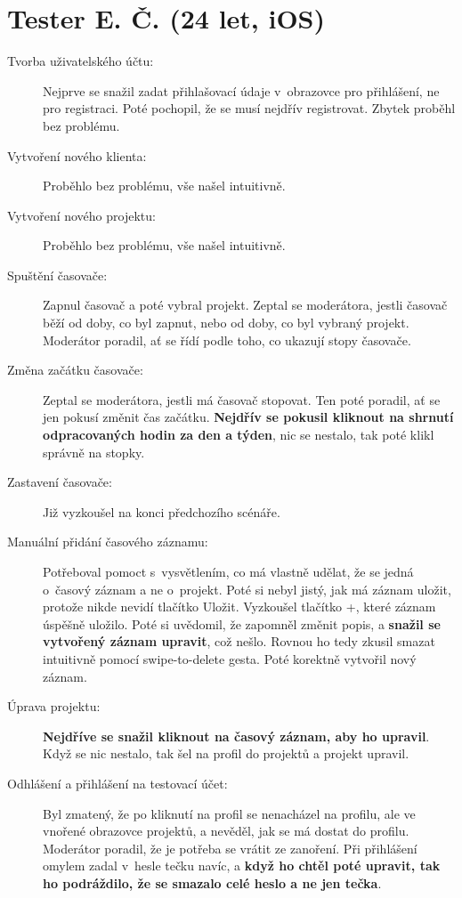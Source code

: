 \section*{Tester E. Č. (24 let, iOS)}

\begin{description}
\item[Tvorba uživatelského účtu:] Nejprve se snažil zadat přihlašovací údaje v~obrazovce pro přihlášení, ne pro registraci. Poté pochopil, že se musí nejdřív registrovat. Zbytek proběhl bez problému.
\item[Vytvoření nového klienta:] Proběhlo bez problému, vše našel intuitivně.
\item[Vytvoření nového projektu:] Proběhlo bez problému, vše našel intuitivně.
\item[Spuštění časovače:] Zapnul časovač a poté vybral projekt. Zeptal se moderátora, jestli časovač běží od doby, co byl zapnut, nebo od doby, co byl vybraný projekt. Moderátor poradil, ať se řídí podle toho, co ukazují stopy časovače.
\item[Změna začátku časovače:] Zeptal se moderátora, jestli má časovač stopovat. Ten poté poradil, ať se jen pokusí změnit čas začátku. \textbf{Nejdřív se pokusil kliknout na shrnutí odpracovaných hodin za den a týden}, nic se nestalo, tak poté klikl správně na stopky.
\item[Zastavení časovače:] Již vyzkoušel na konci předchozího scénáře.
\item[Manuální přidání časového záznamu:] Potřeboval pomoct s~vysvětlením, co má vlastně udělat, že se jedná o~časový záznam a ne o~projekt. Poté si nebyl jistý, jak má záznam uložit, protože nikde nevidí tlačítko Uložit. Vyzkoušel tlačítko +, které záznam úspěšně uložilo. Poté si uvědomil, že zapomněl změnit popis, a \textbf{snažil se vytvořený záznam upravit}, což nešlo. Rovnou ho tedy zkusil smazat intuitivně pomocí swipe-to-delete gesta. Poté korektně vytvořil nový záznam.
\item[Úprava projektu:] \textbf{Nejdříve se snažil kliknout na časový záznam, aby ho upravil}. Když se nic nestalo, tak šel na profil do projektů a projekt upravil.
\item[Odhlášení a přihlášení na testovací účet:] Byl zmatený, že po kliknutí na profil se nenacházel na profilu, ale ve vnořené obrazovce projektů, a nevěděl, jak se má dostat do profilu. Moderátor poradil, že je potřeba se vrátit ze zanoření. Při přihlášení omylem zadal v~hesle tečku navíc, a \textbf{když ho chtěl poté upravit, tak ho podráždilo, že se smazalo celé heslo a ne jen tečka}.

\end{description}
